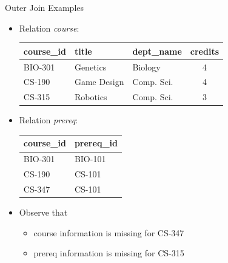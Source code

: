 \documentclass[aspectratio=169]{beamer}
\begin{document}
\begin{frame}{Outer Join Examples}
    \begin{itemize}
        \item Relation \textit{course}: \\
            \vspace{2mm}
            \begin{tabular}{| l | l | l | c |}
                \hline
                \textbf{course\_id} & \textbf{title} & \textbf{dept\_name} & \textbf{credits} \\
                \hline
                BIO-301 & Genetics    & Biology    & 4 \\
                \hline
                CS-190  & Game Design & Comp. Sci. & 4 \\
                \hline
                CS-315  & Robotics    & Comp. Sci. & 3 \\
                \hline
            \end{tabular}
        \item Relation \textit{prereq}: \\
            \vspace{2mm}
            \begin{tabular}{| l | l |}
                \hline
                \textbf{course\_id} & \textbf{prereq\_id} \\
                \hline
                BIO-301 & BIO-101 \\
                \hline
                CS-190  & CS-101  \\
                \hline
                CS-347  & CS-101  \\
                \hline
            \end{tabular}
            \vspace{1mm}
        \item Observe that
        \begin{itemize}
            \item course information is missing for CS-347
            \item prereq information is missing for CS-315
        \end{itemize}
    \end{itemize}
\end{frame}
\end{document}
